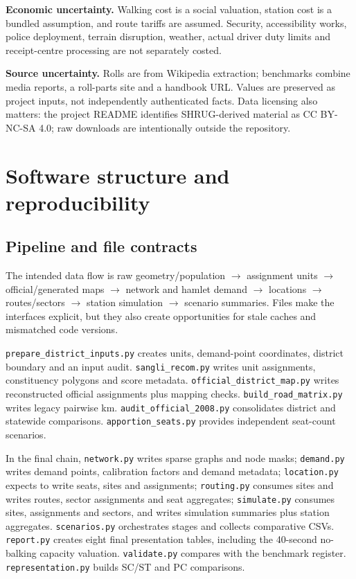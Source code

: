 \documentclass[11pt,a4paper,oneside]{report}
\newcommand{\source}[1]{\par\nopagebreak[4]{\footnotesize\color{teal}Evidence: #1.}\par}
\begin{document}
\textbf{Economic uncertainty.} Walking cost is a social valuation, station cost is a bundled assumption, and route tariffs are assumed. Security, accessibility works, police deployment, terrain disruption, weather, actual driver duty limits and receipt-centre processing are not separately costed.

\textbf{Source uncertainty.} Rolls are from Wikipedia extraction; benchmarks combine media reports, a roll-parts site and a handbook URL. Values are preserved as project inputs, not independently authenticated facts. Data licensing also matters: the project README identifies SHRUG-derived material as CC BY-NC-SA 4.0; raw downloads are intentionally outside the repository.
\source{[S3]--[S14]}

\chapter{Software structure and reproducibility}\label{ch:repro}
\section{Pipeline and file contracts}
The intended data flow is raw geometry/population $\rightarrow$ assignment units $\rightarrow$ official/generated maps $\rightarrow$ network and hamlet demand $\rightarrow$ locations $\rightarrow$ routes/sectors $\rightarrow$ station simulation $\rightarrow$ scenario summaries. Files make the interfaces explicit, but they also create opportunities for stale caches and mismatched code versions.

\texttt{prepare\_district\_inputs.py} creates units, demand-point coordinates, district boundary and an input audit. \texttt{sangli\_recom.py} writes unit assignments, constituency polygons and score metadata. \texttt{official\_district\_map.py} writes reconstructed official assignments plus mapping checks. \texttt{build\_road\_matrix.py} writes legacy pairwise km. \texttt{audit\_official\_2008.py} consolidates district and statewide comparisons. \texttt{apportion\_seats.py} provides independent seat-count scenarios.

In the final chain, \texttt{network.py} writes sparse graphs and node masks; \texttt{demand.py} writes demand points, calibration factors and demand metadata; \texttt{location.py} expects to write seats, sites and assignments; \texttt{routing.py} consumes sites and writes routes, sector assignments and seat aggregates; \texttt{simulate.py} consumes sites, assignments and sectors, and writes simulation summaries plus station aggregates. \texttt{scenarios.py} orchestrates stages and collects comparative CSVs. \texttt{report.py} creates eight final presentation tables, including the 40-second no-balking capacity valuation. \texttt{validate.py} compares with the benchmark register. \texttt{representation.py} builds SC/ST and PC comparisons.
\source{[S2]--[S15]}
\end{document}
